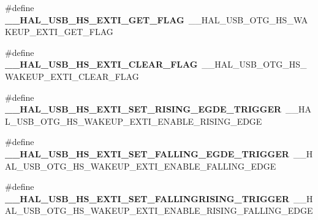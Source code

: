 \begin{DoxyCompactItemize}
\item 
\#define {\bfseries \+\_\+\+\_\+\+H\+A\+L\+\_\+\+U\+S\+B\+\_\+\+H\+S\+\_\+\+E\+X\+T\+I\+\_\+\+G\+E\+T\+\_\+\+F\+L\+AG}~\+\_\+\+\_\+\+H\+A\+L\+\_\+\+U\+S\+B\+\_\+\+O\+T\+G\+\_\+\+H\+S\+\_\+\+W\+A\+K\+E\+U\+P\+\_\+\+E\+X\+T\+I\+\_\+\+G\+E\+T\+\_\+\+F\+L\+AG\hypertarget{group___h_a_l___u_s_b___aliased___macros_ga025ca30b0d6182705d3a59af868ce771}{}\label{group___h_a_l___u_s_b___aliased___macros_ga025ca30b0d6182705d3a59af868ce771}

\item 
\#define {\bfseries \+\_\+\+\_\+\+H\+A\+L\+\_\+\+U\+S\+B\+\_\+\+H\+S\+\_\+\+E\+X\+T\+I\+\_\+\+C\+L\+E\+A\+R\+\_\+\+F\+L\+AG}~\+\_\+\+\_\+\+H\+A\+L\+\_\+\+U\+S\+B\+\_\+\+O\+T\+G\+\_\+\+H\+S\+\_\+\+W\+A\+K\+E\+U\+P\+\_\+\+E\+X\+T\+I\+\_\+\+C\+L\+E\+A\+R\+\_\+\+F\+L\+AG\hypertarget{group___h_a_l___u_s_b___aliased___macros_gae44d0cdfd6c4408c8fbfa1977e31bf4f}{}\label{group___h_a_l___u_s_b___aliased___macros_gae44d0cdfd6c4408c8fbfa1977e31bf4f}

\item 
\#define {\bfseries \+\_\+\+\_\+\+H\+A\+L\+\_\+\+U\+S\+B\+\_\+\+H\+S\+\_\+\+E\+X\+T\+I\+\_\+\+S\+E\+T\+\_\+\+R\+I\+S\+I\+N\+G\+\_\+\+E\+G\+D\+E\+\_\+\+T\+R\+I\+G\+G\+ER}~\+\_\+\+\_\+\+H\+A\+L\+\_\+\+U\+S\+B\+\_\+\+O\+T\+G\+\_\+\+H\+S\+\_\+\+W\+A\+K\+E\+U\+P\+\_\+\+E\+X\+T\+I\+\_\+\+E\+N\+A\+B\+L\+E\+\_\+\+R\+I\+S\+I\+N\+G\+\_\+\+E\+D\+GE\hypertarget{group___h_a_l___u_s_b___aliased___macros_ga146bc9a6b749f5745487f41bae1bff29}{}\label{group___h_a_l___u_s_b___aliased___macros_ga146bc9a6b749f5745487f41bae1bff29}

\item 
\#define {\bfseries \+\_\+\+\_\+\+H\+A\+L\+\_\+\+U\+S\+B\+\_\+\+H\+S\+\_\+\+E\+X\+T\+I\+\_\+\+S\+E\+T\+\_\+\+F\+A\+L\+L\+I\+N\+G\+\_\+\+E\+G\+D\+E\+\_\+\+T\+R\+I\+G\+G\+ER}~\+\_\+\+\_\+\+H\+A\+L\+\_\+\+U\+S\+B\+\_\+\+O\+T\+G\+\_\+\+H\+S\+\_\+\+W\+A\+K\+E\+U\+P\+\_\+\+E\+X\+T\+I\+\_\+\+E\+N\+A\+B\+L\+E\+\_\+\+F\+A\+L\+L\+I\+N\+G\+\_\+\+E\+D\+GE\hypertarget{group___h_a_l___u_s_b___aliased___macros_gaa70bce4e16d41ad8d3e0232b0c235c80}{}\label{group___h_a_l___u_s_b___aliased___macros_gaa70bce4e16d41ad8d3e0232b0c235c80}

\item 
\#define {\bfseries \+\_\+\+\_\+\+H\+A\+L\+\_\+\+U\+S\+B\+\_\+\+H\+S\+\_\+\+E\+X\+T\+I\+\_\+\+S\+E\+T\+\_\+\+F\+A\+L\+L\+I\+N\+G\+R\+I\+S\+I\+N\+G\+\_\+\+T\+R\+I\+G\+G\+ER}~\+\_\+\+\_\+\+H\+A\+L\+\_\+\+U\+S\+B\+\_\+\+O\+T\+G\+\_\+\+H\+S\+\_\+\+W\+A\+K\+E\+U\+P\+\_\+\+E\+X\+T\+I\+\_\+\+E\+N\+A\+B\+L\+E\+\_\+\+R\+I\+S\+I\+N\+G\+\_\+\+F\+A\+L\+L\+I\+N\+G\+\_\+\+E\+D\+GE\hypertarget{group___h_a_l___u_s_b___aliased___macros_ga112c32a1dea904f42275b7067ca4f4d1}{}\label{group___h_a_l___u_s_b___aliased___macros_ga112c32a1dea904f42275b7067ca4f4d1}


\end{DoxyCompactItemize}
